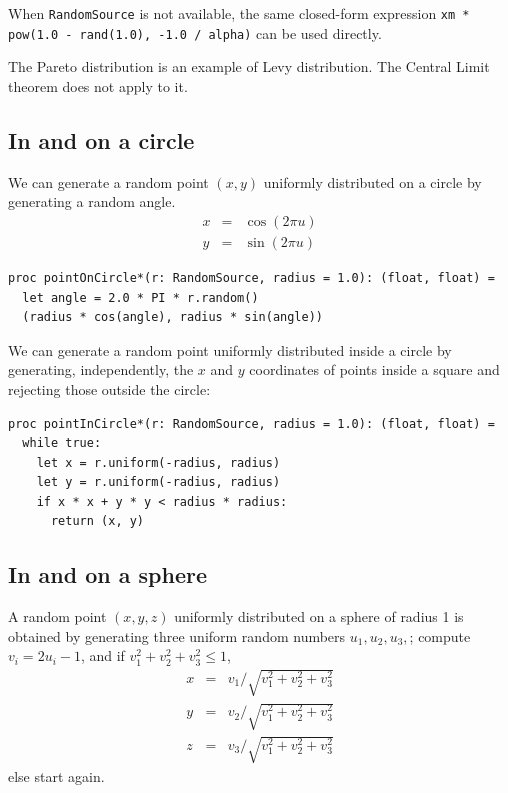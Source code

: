 \documentclass[justified, sixbynine]{tufte-book}
\def\ft{\small\tt}
\theoremstyle{plain}%
\newtheorem * {corollary}{Corollary}
\theoremstyle{definition}
\theoremstyle{remark}
\newtheorem * {remark}{Remark}
\newtheorem * {note}{Note}
\begin{document}
\begin{fullwidth}
When {\ft RandomSource} is not available, the same closed-form expression {\ft xm * pow(1.0 - rand(1.0), -1.0 / alpha)} can be used directly.

The Pareto distribution is an example of Levy distribution. The Central Limit theorem does not apply to it.

\goodbreak\subsection{In and on a circle}

We can generate a random point $(x, y)$ uniformly distributed on a circle by generating a random angle.
\begin{eqnarray}
x &=&\cos (2\pi u) \\
y &=&\sin (2\pi u)
\end{eqnarray}

\begin{lstlisting}[caption={in file: {\ft nlib/randomgen.nim}}]
proc pointOnCircle*(r: RandomSource, radius = 1.0): (float, float) =
  let angle = 2.0 * PI * r.random()
  (radius * cos(angle), radius * sin(angle))
\end{lstlisting}

We can generate a random point uniformly distributed inside a circle by generating, independently, the $x$ and $y$ coordinates of points inside a square and rejecting those outside the circle:

\begin{lstlisting}[caption={in file: {\ft nlib/randomgen.nim}}]
proc pointInCircle*(r: RandomSource, radius = 1.0): (float, float) =
  while true:
    let x = r.uniform(-radius, radius)
    let y = r.uniform(-radius, radius)
    if x * x + y * y < radius * radius:
      return (x, y)
\end{lstlisting}

\goodbreak\subsection{In and on a sphere}

A random point $(x, y, z)$ uniformly distributed on a sphere of radius 1 is
obtained by generating three uniform random numbers $u_1, u_2, u_3, $; compute $%
v_i=2u_i-1$, and if $v_1^2+v_2^2+v_3^2\leq 1$, 
\begin{eqnarray}
x &=&v_1/\sqrt{v_1^2+v_2^2+v_3^2} \\
y &=&v_2/\sqrt{v_1^2+v_2^2+v_3^2} \\
z &=&v_3/\sqrt{v_1^2+v_2^2+v_3^2}
\end{eqnarray}
else start again.


\end{fullwidth}
\end{document}
